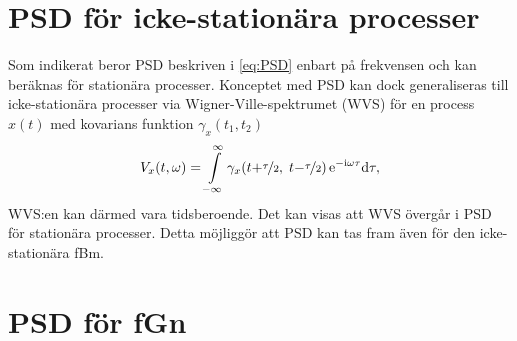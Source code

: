 

\section{PSD för icke-stationära processer}
Som indikerat beror PSD beskriven i \eqref{eq:PSD} enbart på frekvensen och kan beräknas för stationära processer. Konceptet med PSD kan dock generaliseras till icke-stationära processer via Wigner-Ville-spektrumet (WVS) för en process $x(t)$ med kovarians funktion $\gamma_x(t_1,t_2)$ \cite{Flandrin_fBmspektrum1989}
\begin{equation} \label{eq:WVS}
V_x(t,\omega)=
\int^{\infty}_{-\infty} 
\gamma_x\!\left(t{+}\nicefrac{\tau}{2},\; t{-}\nicefrac{\tau}{2}\right) \ee^{-\ii\omega\tau} \dd\tau,
\end{equation}
WVS:en kan därmed vara tidsberoende. Det kan visas att WVS övergår i PSD för stationära processer. Detta möjliggör att PSD kan tas fram även för den icke-stationära fBm.

\section{PSD för fGn}

